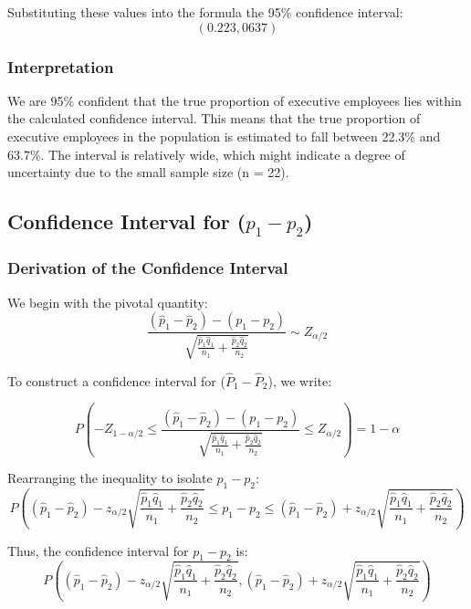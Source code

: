 \documentclass[12pt,a4paper]{article}
\begin{document}
Substituting these values into the formula the 95\% confidence interval:
\[
\left(0.223, 0637 \right)
\]
\subsubsection*{Interpretation}
 
 We are 95\% confident that the true proportion of executive employees lies within the calculated confidence interval. This means that the true proportion of executive employees in the population is estimated to fall between 22.3\% and 63.7\%. The interval is relatively wide, which might indicate a degree of uncertainty due to the small sample size (n = 22). 

\vspace{1em}

\vspace{1em}
\subsection*{Confidence Interval for (\({p}_1 - {p}_2\))}

\subsubsection*{Derivation of the Confidence Interval}

We begin with the pivotal quantity:
 \[
 \frac{(\hat{p}_1 - \hat{p}_2) - (p_1 - p_2)}{\sqrt{\frac{\hat{p}_1  \hat{q}_1}{n_1} + \frac{\hat{p}_2  \hat{q}_2}{n_2}}} \sim Z_{\alpha/2}
\]

To construct a confidence interval for (\(\hat{P}_1 - \hat{P}_2\)), we write:

\[
P\left( -Z_{1-\alpha/2} \leq \frac{(\hat{p}_1 - \hat{p}_2) - (p_1 - p_2)}{\sqrt{\frac{\hat{p}_1  \hat{q}_1}{n_1} + \frac{\hat{p}_2  \hat{q}_2}{n_2}}} \leq Z_{\alpha/2} \right) = 1-\alpha
\]

Rearranging the inequality to isolate \({p_1 - p_2}\):
\[
P\left( (\hat{p}_1 - \hat{p}_2) - z_{\alpha/2} \sqrt{\frac{\hat{p}_1 \hat{q}_1}{n_1} + \frac{\hat{p}_2 \hat{q}_2}{n_2}} \leq {p}_1 - {p}_2 \leq (\hat{p}_1 - \hat{p}_2) + z_{\alpha/2} \sqrt{\frac{\hat{p}_1 \hat{q}_1}{n_1} + \frac{\hat{p}_2 \hat{q}_2}{n_2}} \right)
\]

Thus, the confidence interval for \({p_1 - p_2}\) is:
\[
P\left( (\hat{p}_1 - \hat{p}_2) - z_{\alpha/2} \sqrt{\frac{\hat{p}_1 \hat{q}_1}{n_1} + \frac{\hat{p}_2 \hat{q}_2}{n_2}}, (\hat{p}_1 - \hat{p}_2) + z_{\alpha/2} \sqrt{\frac{\hat{p}_1 \hat{q}_1}{n_1} + \frac{\hat{p}_2 \hat{q}_2}{n_2}} \right) 
\]
\end{document}
